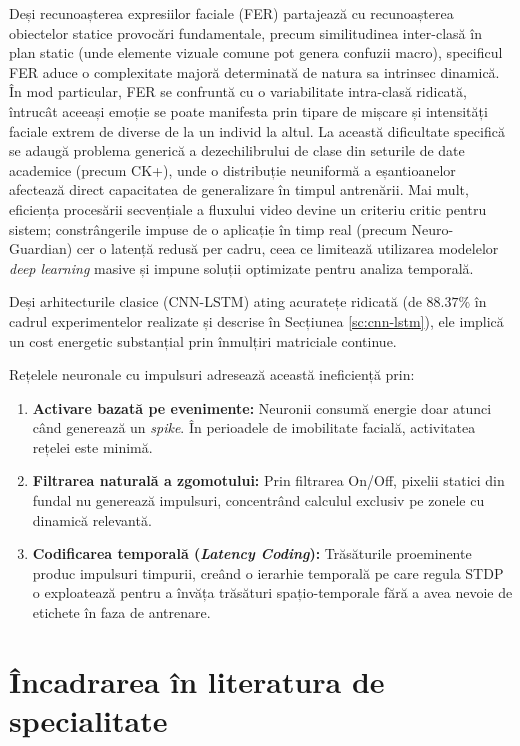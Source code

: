 Deși recunoașterea expresiilor faciale (FER) partajează cu recunoașterea obiectelor statice provocări fundamentale, precum similitudinea inter-clasă în plan static (unde elemente vizuale comune pot genera confuzii macro), specificul FER aduce o complexitate majoră determinată de natura sa intrinsec dinamică. În mod particular, FER se confruntă cu o variabilitate intra-clasă ridicată, întrucât aceeași emoție se poate manifesta prin tipare de mișcare și intensități faciale extrem de diverse de la un individ la altul. La această dificultate specifică se adaugă problema generică a dezechilibrului de clase din seturile de date academice (precum CK+), unde o distribuție neuniformă a eșantioanelor afectează direct capacitatea de generalizare în timpul antrenării. Mai mult, eficiența procesării secvențiale a fluxului video devine un criteriu critic pentru sistem; constrângerile impuse de o aplicație în timp real (precum Neuro-Guardian) cer o latență redusă per cadru, ceea ce limitează utilizarea modelelor \textit{deep learning} masive și impune soluții optimizate pentru analiza temporală. 

Deși arhitecturile clasice (CNN-LSTM) ating acuratețe ridicată (de $88.37\%$ în cadrul experimentelor realizate și descrise în Secțiunea \ref{sc:cnn-lstm}), ele implică un cost energetic substanțial prin înmulțiri matriciale continue. 

Rețelele neuronale cu impulsuri adresează această ineficiență prin:
\begin{enumerate}[noitemsep]
	\item \textbf{Activare bazată pe evenimente:} Neuronii consumă energie doar atunci când generează un \textit{spike}. În perioadele de imobilitate facială, activitatea rețelei este minimă.
	\item \textbf{Filtrarea naturală a zgomotului:} Prin filtrarea On/Off, pixelii statici din fundal nu generează impulsuri, concentrând calculul exclusiv pe zonele cu dinamică relevantă.
	\item \textbf{Codificarea temporală (\textit{Latency Coding}):} Trăsăturile proeminente produc impulsuri timpurii, creând o ierarhie temporală pe care regula STDP o exploatează pentru a învăța trăsături spațio-temporale fără a avea nevoie de etichete în faza de antrenare.
\end{enumerate}

\section*{Încadrarea în literatura de specialitate}

